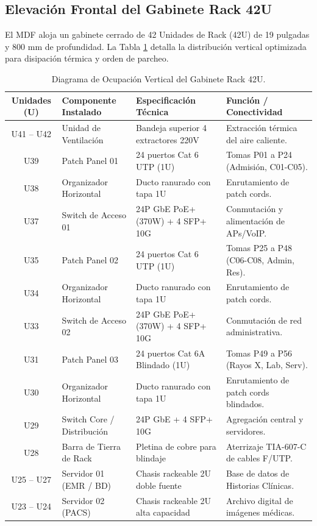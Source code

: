 \documentclass[11pt,a4paper]{article}
\begin{document}
\subsection{Elevación Frontal del Gabinete Rack 42U}
El MDF aloja un gabinete cerrado de 42 Unidades de Rack (42U) de 19 pulgadas y 800 mm de profundidad. La Tabla \ref{tab:rack} detalla la distribución vertical optimizada para disipación térmica y orden de parcheo.

\begin{table}[h!]
\centering
\small
\caption{Diagrama de Ocupación Vertical del Gabinete Rack 42U.}
\label{tab:rack}
\begin{tabularx}{\textwidth}{c l p{5.5cm} X}
\toprule
\textbf{Unidades (U)} & \textbf{Componente Instalado} & \textbf{Especificación Técnica} & \textbf{Función / Conectividad} \\
\midrule
U41 -- U42 & Unidad de Ventilación & Bandeja superior 4 extractores 220V & Extracción térmica del aire caliente. \\
U39 & Patch Panel 01 & 24 puertos Cat 6 UTP (1U) & Tomas P01 a P24 (Admisión, C01-C05). \\
U38 & Organizador Horizontal & Ducto ranurado con tapa 1U & Enrutamiento de patch cords. \\
U37 & Switch de Acceso 01 & 24P GbE PoE+ (370W) + 4 SFP+ 10G & Conmutación y alimentación de APs/VoIP. \\
U35 & Patch Panel 02 & 24 puertos Cat 6 UTP (1U) & Tomas P25 a P48 (C06-C08, Admin, Res). \\
U34 & Organizador Horizontal & Ducto ranurado con tapa 1U & Enrutamiento de patch cords. \\
U33 & Switch de Acceso 02 & 24P GbE PoE+ (370W) + 4 SFP+ 10G & Conmutación de red administrativa. \\
U31 & Patch Panel 03 & 24 puertos Cat 6A Blindado (1U) & Tomas P49 a P56 (Rayos X, Lab, Serv). \\
U30 & Organizador Horizontal & Ducto ranurado con tapa 1U & Enrutamiento de patch cords blindados. \\
U29 & Switch Core / Distribución & 24P GbE + 4 SFP+ 10G & Agregación central y servidores. \\
U28 & Barra de Tierra de Rack & Pletina de cobre para blindaje & Aterrizaje TIA-607-C de cables F/UTP. \\
U25 -- U27 & Servidor 01 (EMR / BD) & Chasis rackeable 2U doble fuente & Base de datos de Historias Clínicas. \\
U23 -- U24 & Servidor 02 (PACS) & Chasis rackeable 2U alta capacidad & Archivo digital de imágenes médicas. \\

\end{tabularx}
\end{table}
\end{document}

